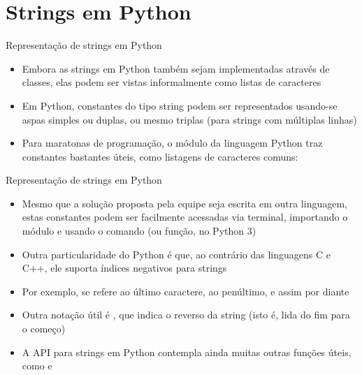 \section{Strings em Python}

\begin{frame}[fragile]{Representação de strings em Python}

    \begin{itemize}
        \item Embora as strings em Python também sejam implementadas através de classes, elas 
            podem ser vistas informalmente como listas de caracteres

        \item Em Python, constantes do tipo string podem ser representados usando-se aspas
            simples ou duplas, ou mesmo triplas (para strings com múltiplas linhas)

        \item Para maratonas de programação, o módulo  da linguagem Python traz 
            constantes bastantes úteis, como listagens de caracteres comuns:

    \end{itemize}

\end{frame}

\begin{frame}[fragile]{Representação de strings em Python}

    \begin{itemize}
        \item Mesmo que a solução proposta pela equipe seja escrita em outra linguagem, estas 
            constantes podem ser facilmente acessadas via terminal, importando o módulo e usando o 
            comando (ou função, no Python 3) 

        \item Outra particularidade do Python é que, ao contrário das linguagens C e C++, ele 
            suporta índices negativos para strings

        \item Por exemplo,  se refere ao último caractere,  ao 
            penúltimo, e assim por diante

        \item Outra notação útil é , que indica o reverso da string 
             (isto é,  lida do fim para o começo)

        \item A API para strings em Python contempla ainda muitas outras funções úteis, como 
             e 
    \end{itemize}

\end{frame}

